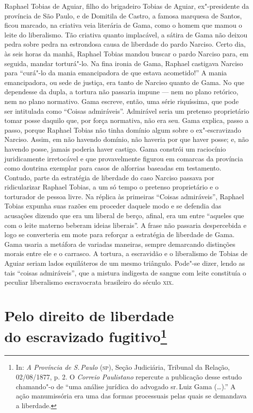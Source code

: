 {\footnotesize\noindent
Raphael Tobias de Aguiar, filho do brigadeiro Tobias de Aguiar,
ex"-presidente da província de São Paulo, e de Domitila de Castro, a
famosa marquesa de Santos, ficou marcado, na criativa veia literária de
Gama, como o homem que mamou o leite do liberalismo. Tão criativa quanto
implacável, a sátira de Gama não deixou pedra sobre pedra na estrondosa
causa de liberdade
do pardo Narciso. Certo dia, às seis horas da manhã, Raphael Tobias
mandou buscar o pardo Narciso para, em seguida, mandar torturá"-lo. Na
fina ironia de Gama, Raphael castigava Narciso para ``curá"-lo da mania
emancipadora de que estava acometido!'' A mania emancipadora, ou sede de
justiça, era tanto de Narciso quanto de Gama. No que dependesse da
dupla, a tortura não passaria impune --- nem no plano retórico, nem no
plano normativo. Gama escreve, então, uma série riquíssima, que pode ser
intitulada como ``Coisas admiráveis''. Admirável
seria um pretenso proprietário tomar posse daquilo que,
por força normativa, não era seu. Gama explica, passo a passo, porque
Raphael Tobias não tinha domínio algum sobre o ex"-escravizado Narciso.
Assim, em não havendo domínio, não haveria por que haver posse; e, não
havendo posse, jamais poderia haver castigo. Gama constrói um raciocínio
juridicamente irretocável e que provavelmente figurou em comarcas da
província como doutrina exemplar para casos de alforrias
baseadas em testamento. Contudo, parte da
estratégia de liberdade do caso Narciso passava por ridicularizar
Raphael Tobias, a um só tempo o pretenso proprietário e o torturador de
pessoa livre. Na réplica às primeiras ``Coisas admiráveis'', Raphael
Tobias expunha suas razões em proceder daquele modo e se defendia das
acusações dizendo que era um liberal de berço, afinal, era um entre
``aqueles que com o leite materno beberam ideias liberais''. A frase não
passaria despercebida e logo se converteria em mote para reforçar a
estratégia de liberdade de Gama.
Gama usaria a metáfora de variadas maneiras, sempre
demarcando distinções morais entre ele e o carrasco.
A tortura, a escravidão e o liberalismo de
Tobias de Aguiar seriam lados equiláteros de um mesmo triângulo.
Pode"-se dizer, lendo as tais ``coisas
admiráveis'', que a mistura indigesta de sangue com leite constituía o
peculiar liberalismo escravocrata brasileiro do século \textsc{xix}.}
\@openrighttrue\makeatother \endgroup

\chapter[Pelo direito de liberdade do escravizado fugitivo]{Pelo direito de liberdade\\ do escravizado fugitivo\footnote[*]{In: \emph{A Província de S.\,Paulo} (\textsc{sp}), Seção
  Judiciária, Tribunal da Relação, 02/08/1877, p. 2. O \emph{Correio
  Paulistano} repercute a publicação desse estudo chamando"-o de ``uma
  análise jurídica do advogado sr.\,Luiz Gama (\ldots{}).'' A ação manumissória
  era uma das formas processuais pelas quais se demandava a liberdade.}}

